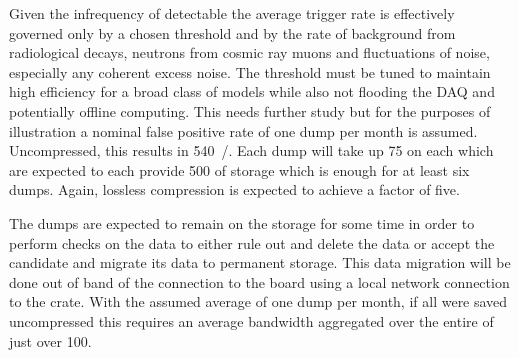 Given the infrequency of detectable  the average
 trigger rate is effectively governed only by a chosen
threshold and by the rate of background from radiological decays,
neutrons from cosmic ray muons and fluctuations of noise, especially
any coherent excess noise. 
The threshold must be tuned to maintain high efficiency for a broad
class of  models while also not flooding the DAQ and
potentially offline computing. 
This needs further study but for the purposes of illustration a
nominal false positive rate of one  dump per month is
assumed. 
Uncompressed, this results in \SI{540}{\TB/\year}. 
Each dump will take up \SI{75}{\GB} on each  which are
expected to each provide \SI{500}{\GB} of storage which is enough for
at least six dumps.
Again, lossless compression is expected to achieve a factor of five.

The  dumps are expected to remain on the 
storage for some time in order to perform checks on the data to either
rule out and delete the data or accept the candidate and migrate its
data to permanent storage. 
This data migration will be done out of band of the connection to the
 board using a local network connection to the
 crate. 
With the assumed average of one dump per month, if all were saved
uncompressed this requires an average bandwidth aggregated over the
entire  of just over \SI{100}{\Mbps}.

